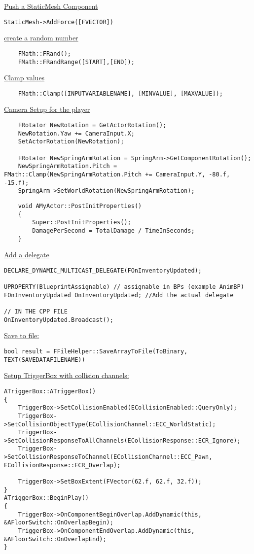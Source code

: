         \uline{Push a StaticMesh Component}
\begin{lstlisting}
StaticMesh->AddForce([FVECTOR])
\end{lstlisting}
\smallskip
        \uline{create a random number}
        \begin{lstlisting}
    FMath::FRand();
    FMath::FRandRange([START],[END]);
        \end{lstlisting}
\smallskip
        \uline{Clamp values}
        \begin{lstlisting}
    FMath::Clamp([INPUTVARIABLENAME], [MINVALUE], [MAXVALUE]);
        \end{lstlisting}
\smallskip
        \uline{Camera Setup for the player}
        \begin{lstlisting}
    FRotator NewRotation = GetActorRotation();
    NewRotation.Yaw += CameraInput.X;
    SetActorRotation(NewRotation);

    FRotator NewSpringArmRotation = SpringArm->GetComponentRotation();
    NewSpringArmRotation.Pitch = FMath::Clamp(NewSpringArmRotation.Pitch += CameraInput.Y, -80.f, -15.f);
    SpringArm->SetWorldRotation(NewSpringArmRotation);
        \end{lstlisting}
\smallskip
        \begin{lstlisting}
    void AMyActor::PostInitProperties()
    {
        Super::PostInitProperties();
        DamagePerSecond = TotalDamage / TimeInSeconds;
    }
        \end{lstlisting}
\smallskip
        \uline{Add a delegate}
\begin{lstlisting}
DECLARE_DYNAMIC_MULTICAST_DELEGATE(FOnInventoryUpdated);

UPROPERTY(BlueprintAssignable) // assignable in BPs (example AnimBP)
FOnInventoryUpdated OnInventoryUpdated; //Add the actual delegate

// IN THE CPP FILE
OnInventoryUpdated.Broadcast();
\end{lstlisting}

        \uline{Save to file:}
\begin{lstlisting}
bool result = FFileHelper::SaveArrayToFile(ToBinary, TEXT(SAVEDATAFILENAME))
\end{lstlisting}
        \uline{Setup TriggerBox with collision channels:}
\begin{lstlisting}
ATriggerBox::ATriggerBox()
{
    TriggerBox->SetCollisionEnabled(ECollisionEnabled::QueryOnly);
    TriggerBox->SetCollisionObjectType(ECollisionChannel::ECC_WorldStatic);
    TriggerBox->SetCollisionResponseToAllChannels(ECollisionResponse::ECR_Ignore);
    TriggerBox->SetCollisionResponseToChannel(ECollisionChannel::ECC_Pawn, ECollisionResponse::ECR_Overlap);

    TriggerBox->SetBoxExtent(FVector(62.f, 62.f, 32.f));
}
ATriggerBox::BeginPlay()
{
    TriggerBox->OnComponentBeginOverlap.AddDynamic(this, &AFloorSwitch::OnOverlapBegin);
    TriggerBox->OnComponentEndOverlap.AddDynamic(this, &AFloorSwitch::OnOverlapEnd);
}
\end{lstlisting}

